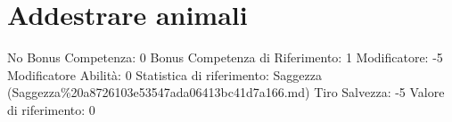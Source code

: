 \section{Addestrare animali}\label{addestrare-animali}

\begin{description}
\tightlist
\item[Tags: ABI]
No Bonus Competenza: 0 Bonus Competenza di Riferimento: 1 Modificatore:
-5 Modificatore Abilità: 0 Statistica di riferimento: Saggezza
(Saggezza\%20a8726103e53547ada06413bc41d7a166.md) Tiro Salvezza: -5
Valore di riferimento: 0
\end{description}
